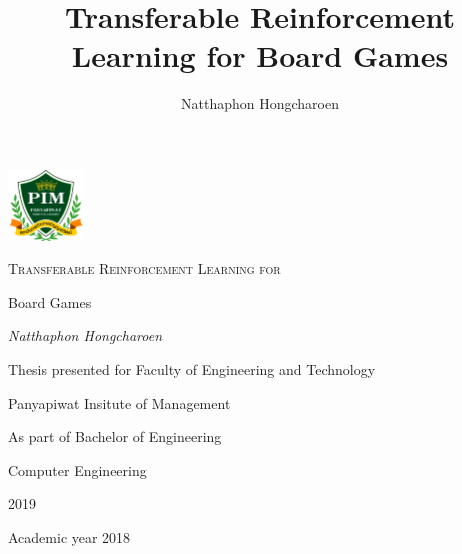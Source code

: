 \documentclass[12pt,a4paper]{report}
\title{Transferable Reinforcement Learning for Board Games}
\author{Natthaphon Hongcharoen}
\begin{document}

\begin{titlepage}
	\centering
	\includegraphics[width=0.15\textwidth]{logo.png}\par\vspace{1cm}
	{\scshape\Huge Transferable Reinforcement Learning for \par Board Games\par}
	\vfill
	{\Large\itshape Natthaphon Hongcharoen\par}
	\vfill
	{\Large  \par}
	{\large Thesis presented for Faculty of Engineering and Technology \par\vspace{0.1cm}}
	{\large Panyapiwat Insitute of Management\par\vspace{0.1cm}}
        {\large As part of  Bachelor of Engineering\par\vspace{0.1cm}}
	{\large Computer Engineering\par\vspace{0.1cm}}

	{\large 2019
	}


	{\large Academic year 2018 \par}
\end{titlepage}

\makeatletter
\patchcmd{\@makechapterhead}{\vspace*{50\p@}}{}{}{}%
\patchcmd{\@makeschapterhead}{\vspace*{50\p@}}{}{}{}%
\end{document}

